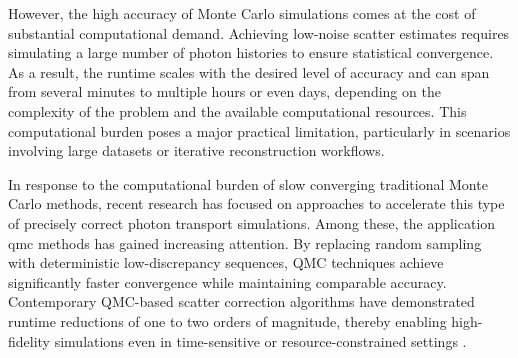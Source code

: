 However, the high accuracy of Monte Carlo simulations comes at the cost of
substantial computational demand. Achieving low-noise scatter estimates requires
simulating a large number of photon histories to ensure statistical convergence.
As a result, the runtime scales with the desired level of accuracy and can span
from several minutes to multiple hours or even days, depending on the complexity
of the problem and the available computational resources. This computational
burden poses a major practical limitation, particularly in scenarios involving
large datasets or iterative reconstruction workflows.

In response to the computational burden of slow converging traditional Monte
Carlo methods, recent research has focused on approaches to accelerate this type
of precisely correct photon transport simulations. Among these, the application
\ac{qmc} methods has gained increasing attention. By replacing random sampling
with deterministic low-discrepancy sequences, QMC techniques achieve
significantly faster convergence while maintaining comparable accuracy.
Contemporary QMC-based scatter correction algorithms have demonstrated runtime
reductions of one to two orders of magnitude, thereby enabling high-fidelity
simulations even in time-sensitive or resource-constrained settings
\cite{qmcXray2023}.
